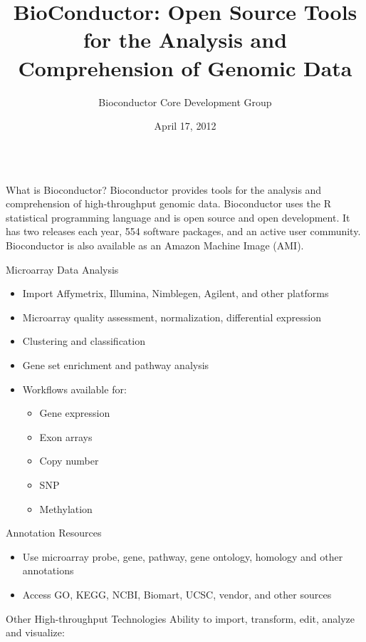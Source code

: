 \documentclass[final]{beamer}
\title{BioConductor:  Open Source Tools for the Analysis and Comprehension of Genomic Data}
\author{Bioconductor Core Development Group}
\date{April 17, 2012}
\begin{document}
\begin{frame}[t]
  \begin{columns}[t]
    \begin{column}{0.24\linewidth}
      \begin{block}{What is Bioconductor?}
        Bioconductor provides tools for the analysis and comprehension of high-throughput genomic data. Bioconductor uses the R statistical programming language and is open source and open development. It has two releases each year, 554 software packages, and an active user community. Bioconductor is also available as an Amazon Machine Image (AMI).
      \end{block}
      \begin{block}{Microarray Data Analysis}
        \begin{itemize}
        \item{Import Affymetrix, Illumina, Nimblegen, Agilent, and other platforms}
        \item{Microarray quality assessment, normalization, differential expression}
        \item{Clustering and classification}
        \item{Gene set enrichment and pathway analysis}
        \item{Workflows available for:}
     \begin{itemize}
       \item{Gene expression}
       \item{Exon arrays}
       \item{Copy number}
       \item{SNP}
       \item{Methylation}
     \end{itemize}
        \end{itemize}
      \end{block}
      \begin{block}{Annotation Resources}
        \begin{itemize}
          \item{Use microarray probe, gene, pathway, gene ontology, homology and other annotations} 
          \item{Access GO, KEGG, NCBI, Biomart, UCSC, vendor, and other sources}
        \end{itemize}
        \end{block}
      \begin{block}{Other High-throughput Technologies}
        Ability to import, transform, edit, analyze and visualize:

\end{block}
\end{column}
\end{columns}
\end{frame}
\end{document}

